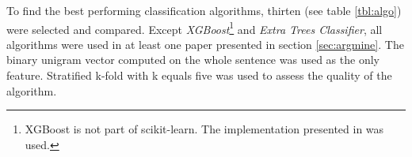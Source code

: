 To find the best performing classification algorithms, thirten (see table \ref{tbl:algo}) were selected and compared. Except \emph{XGBoost}\footnote{XGBoost is not part of scikit-learn. The implementation presented in \cite{DBLP:journals/corr/ChenG16} was used.} and \emph{Extra Trees Classifier}, all algorithms were used in at least one paper presented in section \ref{sec:argmine}. The binary unigram vector computed on the whole sentence was used as the only feature. Stratified k-fold with k equals five was used to assess the quality of the algorithm.





%
%
%
%
%
%
%
%
%
%
%
%
%
%
%
%
%


